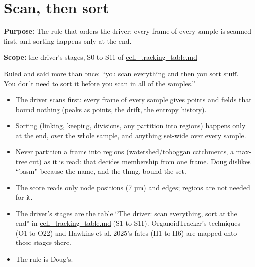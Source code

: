 \chapter{\texorpdfstring{Scan, then sort}{Scan, then sort}}
\label{chap:scan-then-sort}

\textbf{Purpose:} The rule that orders the driver: every frame of every sample is scanned first, and sorting happens only at the end.

\textbf{Scope:} the driver's stages, S0 to S11 of \hyperref[chap:cell-tracking-table]{cell\_\allowbreak{}tracking\_\allowbreak{}table.md}.

Ruled and said more than once: “you scan everything and then you sort stuff. You don't need to sort it before you scan in all of the samples.”

\begin{itemize}
\item The driver scans first: every frame of every sample gives points and fields that bound nothing (peaks as points, the drift, the entropy history).
\item Sorting (linking, keeping, divisions, any partition into regions) happens only at the end, over the whole sample, and anything set-wide over every sample.
\item Never partition a frame into regions (watershed/toboggan catchments, a max-tree cut) as it is read: that decides membership from one frame. Doug dislikes “basin” because the name, and the thing, bound the set.
\item The score reads only node positions (7 µm) and edges; regions are not needed for it.
\item The driver's stages are the table “The driver: scan everything, sort at the end” in \hyperref[chap:cell-tracking-table]{cell\_\allowbreak{}tracking\_\allowbreak{}table.md} (S1 to S11). OrganoidTracker's techniques (O1 to O22) and Hawkins et al. 2025's fates (H1 to H6) are mapped onto those stages there.
\item The rule is Doug's.
\end{itemize}
